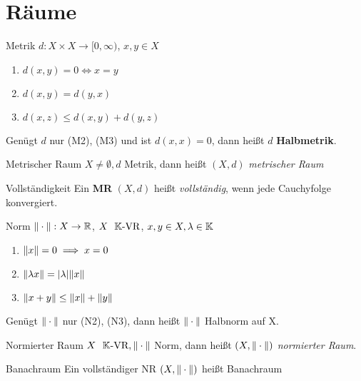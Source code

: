 
\section{Räume}
\begin{definition}{Metrik}
  $d:X \times X \to [0,\infty)$, $x,y \in X$
  \begin{enumerate}[label=(M\arabic*)]
    \item $d(x,y) = 0 \Leftrightarrow x = y$
    \item $d(x,y) = d(y,x)$
    \item $d(x,z) \leq d(x,y) + d(y,z)$
  \end{enumerate}
\end{definition}

Genügt $d$ nur (M2), (M3) und ist $d(x,x) = 0$, dann heißt $d$
\textbf{Halbmetrik}.
\heel

\begin{definition}{Metrischer Raum}
  $X \neq \emptyset, d$ Metrik, dann heißt $(X,d)$ \textit{metrischer Raum}
\end{definition}

\begin{definition}{Vollständigkeit}
  Ein \textbf{MR} $(X,d)$ heißt \textit{vollständig}, wenn jede Cauchyfolge
  konvergiert.
\end{definition}

\begin{definition}{Norm}
  $\|\cdot\|:X\to\mathbb{R}$, $X\ \ \mathbb{K} \text{-VR}$, $x,y \in X, \lambda \in \mathbb{K}$
  \begin{enumerate}[label=(N\arabic*)]
    \item $\|x\| = 0 \implies x = 0$
    \item $\|\lambda x\| = |\lambda|\|x\|$
    \item $\|x+y\| \leq \|x\| + \|y\|$
  \end{enumerate}
\end{definition}

Genügt $\|\cdot\|$ nur (N2), (N3), dann heißt $\|\cdot\|$
Halbnorm auf X.
\heel

\begin{definition}{Normierter Raum}
  $X\ \ \mathbb{K} \text{-VR}, \|\cdot\|$ Norm, dann heißt $(X,\|\cdot\|)$
  \textit{normierter Raum}.
\end{definition}

\begin{definition}{Banachraum}
  Ein vollständiger NR ${(X,\|\cdot\|)}$ heißt Banachraum
\end{definition}

